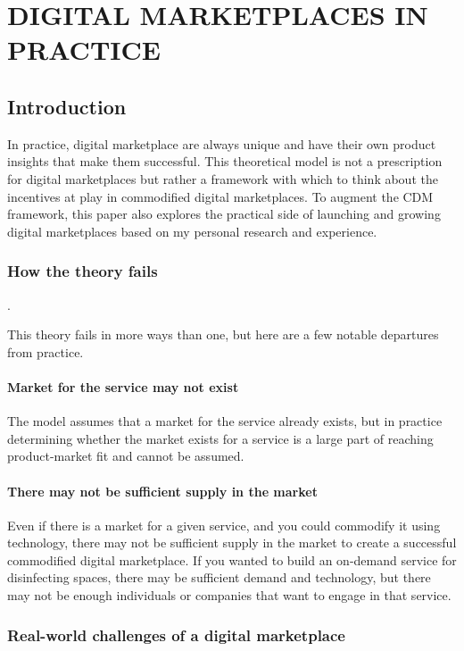 \chapter{DIGITAL MARKETPLACES IN PRACTICE}
\section{Introduction}

In practice, digital marketplace are always unique and have their own product insights that make them successful. This theoretical model is not a prescription for digital marketplaces but rather a framework with which to think about the incentives at play in commodified digital marketplaces. To augment the CDM framework, this paper also explores the practical side of launching and growing digital marketplaces based on my personal research and experience.

\subsection{How the theory fails}.

This theory fails in more ways than one, but here are a few notable departures from practice.

\subsubsection{Market for the service may not exist}

The model assumes that a market for the service already exists, but in practice determining whether the market exists for a service is a large part of reaching product-market fit and cannot be assumed.

\subsubsection{There may not be sufficient supply in the market}

Even if there is a market for a given service, and you could commodify it using technology, there may not be sufficient supply in the market to create a successful commodified digital marketplace. If you wanted to build an on-demand service for disinfecting spaces, there may be sufficient demand and technology, but there may not be enough individuals or companies that want to engage in that service.

\subsection{Real-world challenges of a digital marketplace}

